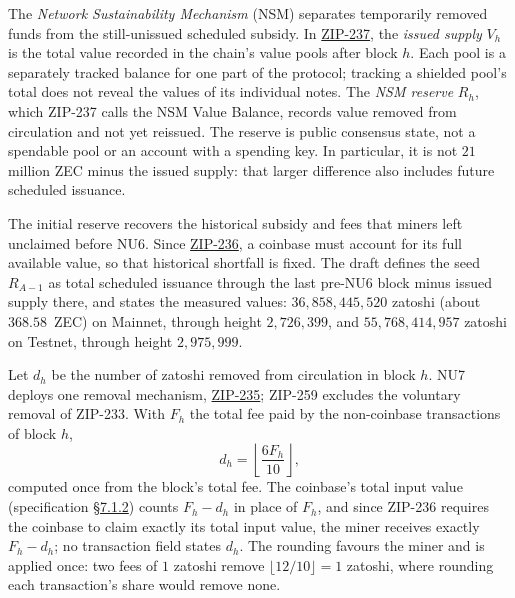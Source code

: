 \documentclass[11pt,a4paper]{article}
\theoremstyle{definition}
\begin{document}
The \emph{Network Sustainability Mechanism} (NSM) separates temporarily
removed funds from the still-unissued scheduled subsidy. In
\href{https://zips.z.cash/zip-0237}{ZIP-237}, the
\emph{issued supply} $V_h$ is the total value recorded in the chain's
value pools after block $h$. Each pool is a separately tracked balance
for one part of the protocol; tracking a shielded pool's total does not
reveal the values of its individual notes. The \emph{NSM reserve} $R_h$,
which ZIP-237 calls the NSM Value Balance, records value removed from
circulation and not yet reissued. The reserve is public
consensus state, not a spendable pool or an account with a spending key.
In particular, it is not $21$ million ZEC minus the issued supply: that
larger difference also includes future scheduled issuance.

The initial reserve recovers the historical subsidy and fees that miners
left unclaimed before NU6. Since
\href{https://zips.z.cash/zip-0236}{ZIP-236}, a coinbase must account for
its full available value, so that historical shortfall is fixed. The draft
defines the seed $R_{A-1}$ as total scheduled issuance through the last
pre-NU6 block minus issued supply there, and states the measured values:
$36{,}858{,}445{,}520$ zatoshi (about $368.58$~ZEC) on Mainnet, through
height $2{,}726{,}399$, and $55{,}768{,}414{,}957$ zatoshi on Testnet,
through height $2{,}975{,}999$.

Let $d_h$ be the number of zatoshi removed from circulation in block $h$.
NU7 deploys one removal mechanism,
\href{https://zips.z.cash/zip-0235}{ZIP-235}; ZIP-259 excludes the voluntary
removal of ZIP-233. With $F_h$ the total fee paid by the non-coinbase
transactions of block $h$,
\[
 d_h=\left\lfloor\frac{6F_h}{10}\right\rfloor,
\]
computed once from the block's total fee. The coinbase's total input value
(specification
\href{https://zips.z.cash/protocol/protocol.pdf\#txnconsensus}{\S7.1.2})
counts $F_h-d_h$ in place of $F_h$, and since ZIP-236 requires the coinbase
to claim exactly its total input value, the miner receives exactly
$F_h-d_h$; no transaction field states $d_h$. The rounding favours the
miner and is applied once: two fees of $1$ zatoshi remove
$\lfloor12/10\rfloor=1$ zatoshi, where rounding each transaction's share
would remove none.
\end{document}
